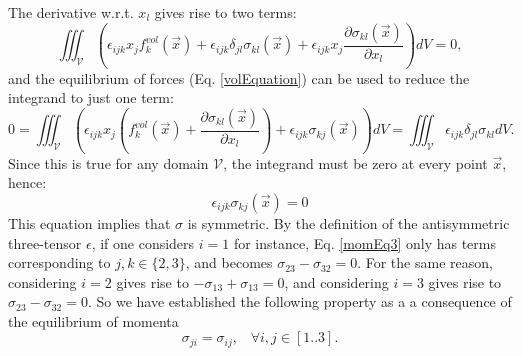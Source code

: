 \documentclass[DIV=12]{article}
\newcommand{\vol}{\mathcal{V}}
\newcommand{\intVol}{\iiint}
\begin{document}
 The derivative w.r.t. $x_l$ gives rise to two terms:
\begin{equation}
 \intVol_\vol  \left( \epsilon_{ijk} x_j f^{vol}_k ( \vec{x})+  \epsilon_{ijk} \delta_{jl}  \sigma_{kl}(\vec{x})+  \epsilon_{ijk} x_j  \frac{\partial \sigma_{kl}(\vec{x})}{\partial x_l}\right) dV  = 0,
\label{momEq2}
\end{equation}
and the equilibrium of forces (Eq. \ref{volEquation}) can be used to reduce the integrand to just one term:
\begin{equation}
0 = \intVol_\vol  \left( \epsilon_{ijk} x_j \left(  f^{vol}_k( \vec{x}) + \frac{\partial \sigma_{kl}(\vec{x})}{\partial x_l}  \right) +  \epsilon_{ijk}  \sigma_{kj}(\vec{x}) \right) dV
 = \intVol_\vol  \epsilon_{ijk} \delta_{jl}  \sigma_{kl}  dV.
\label{momEq3}
\end{equation}
 Since this is true for any domain $\vol$, the integrand must be zero at every point $\vec{x}$, hence:
\begin{equation}
\epsilon_{ijk}  \sigma_{kj}(\vec{x}) = 0
\label{momEq3}
\end{equation}
This equation implies that $\sigma$ is symmetric. By the definition of the antisymmetric three-tensor
 $\epsilon$, if one considers $i=1$ for instance, Eq. \ref{momEq3} only has terms corresponding 
 to $j,k \in \{2,3\}$, and becomes $\sigma_{23} - \sigma_{32} = 0$. For the same reason, 
 considering $i=2$ gives rise to $-\sigma_{13} + \sigma_{13} = 0$, and considering $i=3$
  gives rise to $\sigma_{23} - \sigma_{32} = 0$. So we have established 
 the following property as a a consequence of the equilibrium of momenta
\begin{equation}
\boxed{ \sigma_{ji} = \sigma_{ij}, \;\;\; \forall i,j \in [1..3].}
\end{equation}
\end{document}

